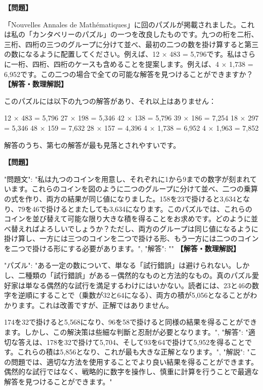 \documentclass[10pt,a4paper,oneside,openany]{ltjsbook}
\begin{document}
\begin{tcolorbox}[colback=softblue,colframe=primaryblue,title=\textbf{第 80 問：三つのグループ （原題: THE THREE GROUPS.）},arc=2mm,boxrule=1pt,breakable]
\textbf{【問題】}\par\vspace{0.3em}
「Nouvelles Annales de Mathématiques」に回のパズルが掲載されました。これは私の「カンタベリーのパズル」の一つを改良したものです。九つの桁を二桁、三桁、四桁の三つのグループに分けて並べ、最初の二つの数を掛け算すると第三の数になるように配置してください。例えば、12 × 483 = 5,796です。私はさらに一桁、四桁、四桁のケースも含めることを提案します。例えば、4 × 1,738 = 6,952です。この二つの場合で全ての可能な解答を見つけることができますか？
\tcblower
\textbf{【解答・数理解説】}\par\vspace{0.3em}
このパズルには以下の九つの解答があり、それ以上はありません：

12 × 483 = 5,796     27 × 198 = 5,346
42 × 138 = 5,796     39 × 186 = 7,254
18 × 297 = 5,346     48 × 159 = 7,632
        28 ×   157 = 4,396
         4 × 1,738 = 6,952
         4 × 1,963 = 7,852

解答のうち、第七の解答が最も見落とされやすいです。
\end{tcolorbox}

\begin{tcolorbox}[colback=softblue,colframe=primaryblue,title=\textbf{第 81 問：THE NINE COUNTERS.},arc=2mm,boxrule=1pt,breakable]
\textbf{【問題】}\par\vspace{0.3em}
{
  "問題文": "私は九つのコインを用意し、それぞれに1から9までの数字が刻まれています。これらのコインを図のように二つのグループに分けて並べ、二つの乗算の式を作り、両方の結果が同じ値になりました。158を23で掛けると3,634となり、79を46で掛けるとまたしても3,634になります。このパズルでは、これらのコインを並び替えて可能な限り大きな積を得ることをお求めです。どのように並べ替えればよろしいでしょうか？ただし、両方のグループは同じ値になるように掛け算し、一方には三つのコインを二つで掛ける形、もう一方には二つのコインを二つで掛ける形にする必要があります。",
  "解答": ""
}
\tcblower
\textbf{【解答・数理解説】}\par\vspace{0.3em}
{
"パズル": "ある一定の数について、単なる「試行錯誤」は避けられない。しかし、二種類の「試行錯誤」がある－偶然的なものと方法的なもの。真のパズル愛好家は単なる偶然的な試行を満足するわけにはいかない。読者には、23と46の数字を逆順にすることで（乗数が32と64になる）、両方の積が5,056となることがわかります。これは改善ですが、正解ではありません。

174を32で掛けると5,568になり、96を58で掛けると同様の結果を得ることができます。しかし、この解決策は些細な判斷と忍耐が必要となります。",
"解答": "適切な答えは、178を32で掛けて5,704、そして93を64で掛けて5,952を得ることです。これらの積は5,856となり、これが最も大きな正解となります。",
"解説": "この問題では、適切な方法を使用することでより良い結果を得ることができます。偶然的な試行ではなく、戦略的に数字を操作し、慎重に計算を行うことで最適な解答を見つけることができます。"
}
\end{tcolorbox}
\end{document}
